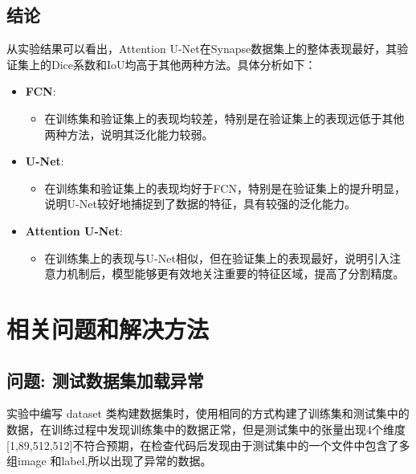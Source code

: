 \documentclass[a4paper,12pt]{report}
\begin{document}
\subsection{结论}
从实验结果可以看出，Attention U-Net在Synapse数据集上的整体表现最好，其验证集上的Dice系数和IoU均高于其他两种方法。具体分析如下：

\begin{itemize}
    \item \textbf{FCN}:
        \begin{itemize}
            \item 在训练集和验证集上的表现均较差，特别是在验证集上的表现远低于其他两种方法，说明其泛化能力较弱。
        \end{itemize}
    \item \textbf{U-Net}:
        \begin{itemize}
            \item 在训练集和验证集上的表现均好于FCN，特别是在验证集上的提升明显，说明U-Net较好地捕捉到了数据的特征，具有较强的泛化能力。
        \end{itemize}
    \item \textbf{Attention U-Net}:
        \begin{itemize}
            \item 在训练集上的表现与U-Net相似，但在验证集上的表现最好，说明引入注意力机制后，模型能够更有效地关注重要的特征区域，提高了分割精度。
        \end{itemize}
\end{itemize}

\section{相关问题和解决方法}

\subsection{问题: 测试数据集加载异常}
实验中编写 dataset 类构建数据集时，使用相同的方式构建了训练集和测试集中的数据，在训练过程中发现训练集中的数据正常，但是测试集中的张量出现4个维度[1,89,512,512]不符合预期，在检查代码后发现由于测试集中的一个文件中包含了多组image 和label,所以出现了异常的数据。
\end{document}
